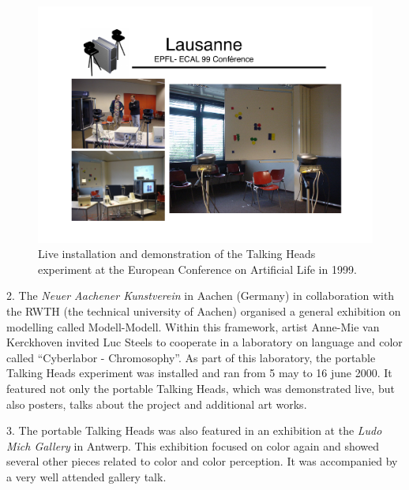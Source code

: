 \begin{figure}[htbp]
  \centerline{\includegraphics[width=.90\textwidth]{chap9/figs/Lausanne}}
\caption{\label{fig:lausanne} 
Live installation and demonstration of the Talking Heads experiment at the European Conference on Artificial 
Life in 1999.}
\end{figure}

2. The {\itshape Neuer Aachener Kunstverein} in Aachen (Germany) in collaboration with the 
RWTH (the technical university of Aachen) organised a general exhibition on modelling called 
Modell-Modell. Within this framework, artist Anne-Mie van Kerckhoven invited Luc Steels to cooperate in a laboratory on 
language and color called ``Cyberlabor - Chromosophy''. As part of this laboratory, the portable Talking Heads 
experiment was installed and ran from 5 may to 16 june 2000. It featured not only the portable Talking Heads, 
which was demonstrated live, but also posters, talks about the project and additional art works. 

3. The portable Talking Heads was also featured in an exhibition at the {\itshape Ludo Mich Gallery} in Antwerp. This 
exhibition focused on color again and showed several other pieces related to color and color perception. 
It was accompanied by a very well attended gallery talk. 

